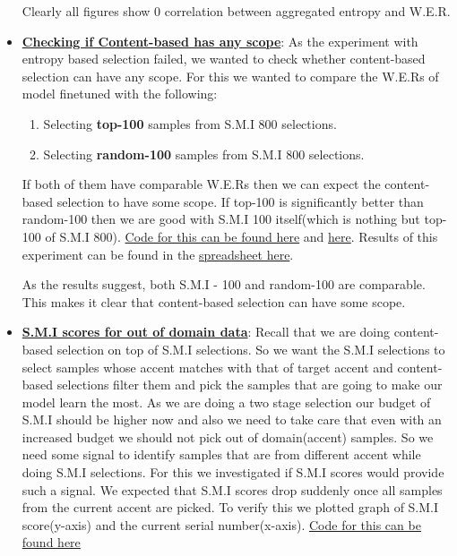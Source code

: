 \documentclass[12pt, a4paper, twoside]{article}
\begin{document}
\begin{itemize}
    Clearly all figures show 0 correlation between aggregated entropy and W.E.R. 
    
    \item \textbf{\underline{Checking if Content-based has any scope}}: As the experiment with entropy based selection failed,  we wanted to check whether content-based selection can have any scope. For this we wanted to compare the W.E.Rs of model finetuned with the following:
    \begin{enumerate}
        \item Selecting \textbf{top-100} samples from S.M.I 800 selections.
        \item Selecting \textbf{random-100} samples from S.M.I 800 selections.
    \end{enumerate}
    If both of them have comparable W.E.Rs then we can expect the content-based selection to have some scope. If top-100 is significantly better than random-100 then we are good with S.M.I 100 itself(which is nothing but top-100 of S.M.I 800). \href{https://github.com/ChandraSekhar123331/RnD-Coding-Work/blob/master/indic-scripts/runner.sh}{Code for this can be found here} and \href{https://github.com/ChandraSekhar123331/RnD-Coding-Work/blob/master/indic-scripts/runner_random.sh}{here}. Results of this experiment can be found in the \href{https://docs.google.com/spreadsheets/d/1Eut6CuPrD-cOcxuAcKcMZC4wSzluujR_MSDu-bSArBY/edit#gid=0}{spreadsheet here}. 
    
    As the results suggest, both S.M.I - 100 and random-100 are comparable. This makes it clear that content-based selection can have some scope. 
    
    \item \textbf{\underline{S.M.I scores for out of domain data}}: Recall that we are doing content-based selection on top of S.M.I selections. So we want the S.M.I selections to select samples whose accent matches with that of target accent and content-based selections filter them and pick the samples that are going to make our model learn the most. As we are doing a two stage selection our budget of S.M.I should be higher now and also we need to take care that even with an increased budget we should not pick out of domain(accent) samples. So we need some signal to identify samples that are from different accent while doing S.M.I selections. For this we investigated if S.M.I scores would provide such a signal. We expected that S.M.I scores drop suddenly once all samples from the current accent are picked. To verify this we plotted graph of S.M.I score(y-axis) and the current serial number(x-axis). \href{https://github.com/ChandraSekhar123331/RnD-Coding-Work/blob/master/indic-scripts/TSS_print_gains.py}{Code for this can be found here}
    

\end{itemize}
\end{document}
